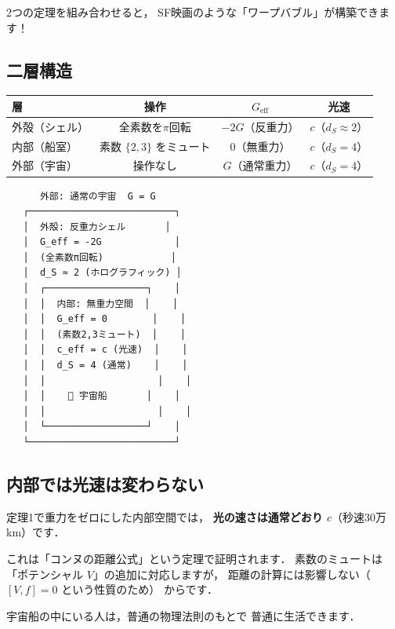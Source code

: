 \documentclass[11pt,a4paper]{article}
\begin{document}
2つの定理を組み合わせると，
SF映画のような「ワープバブル」が構築できます！

\subsection{二層構造}

\begin{center}
\begin{tabular}{lccc}
\toprule
層 & 操作 & $G_{\text{eff}}$ & 光速 \\
\midrule
外殻（シェル） & 全素数を$\pi$回転 & $-2G$（反重力） & $c$（$d_S \approx 2$） \\
内部（船室） & 素数 $\{2,3\}$ をミュート & $0$（無重力） & $c$（$d_S = 4$） \\
外部（宇宙） & 操作なし & $G$（通常重力） & $c$（$d_S = 4$） \\
\bottomrule
\end{tabular}
\end{center}

\begin{tcolorbox}[colback=cyan!5,colframe=cyan!50!black,title=アスキーアート: ワープバブルの断面図]
\begin{verbatim}
      外部: 通常の宇宙  G = G
   ┌──────────────────────────┐
   │  外殻: 反重力シェル       │
   │  G_eff = -2G             │
   │  (全素数π回転)            │
   │  d_S ≈ 2 (ホログラフィック) │
   │  ┌──────────────────┐    │
   │  │  内部: 無重力空間  │    │
   │  │  G_eff = 0        │    │
   │  │  (素数2,3ミュート)  │    │
   │  │  c_eff = c (光速)  │    │
   │  │  d_S = 4 (通常)    │    │
   │  │                    │    │
   │  │    🚀 宇宙船       │    │
   │  │                    │    │
   │  └──────────────────┘    │
   └──────────────────────────┘
\end{verbatim}
\end{tcolorbox}

\subsection{内部では光速は変わらない}

定理1で重力をゼロにした内部空間では，
\textbf{光の速さは通常どおり $c$}（秒速30万km）です．

これは「コンヌの距離公式」という定理で証明されます．
素数のミュートは「ポテンシャル $V$」の追加に対応しますが，
距離の計算には影響しない（$[V, f] = 0$ という性質のため）
からです．

宇宙船の中にいる人は，普通の物理法則のもとで
普通に生活できます．
\end{document}
